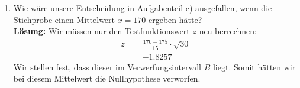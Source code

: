 \documentclass[11pt, a4paper]{article}
\begin{document}
\begin{enumerate}[label=\alph*)]
\begin{align*}
&= \frac{172 - 175}{15} \cdot \sqrt{30}\\
&\approx -1.0954
\intertext{Als nächstes ist der Verwerfungsbereich $B$ zu bestimmen mit $x_{1-\alpha} $ als $ (1-\alpha)$-Fraktil der $\mathcal N(0,1)$-Verteilung:}
B &\overset{\text{b)}}{=} (-\infty, -x_{1-\alpha})\\
&= (-\infty, -x_{1-0.04})\\
&= (-\infty, -x_{0.96})\\
&= (-\infty, -1.7507)
\end{align*}
Wir stellen fest, dass der Testfunktionswert $z \approx -1.0954$ nicht im Intervall B ist. Somit verwerfen wir unsere Nullhypothese nicht. Die Bahnen sind tatsächlich im Durchschnitt überfüllt.
\item Wie wäre unsere Entscheidung in Aufgabenteil c) ausgefallen, wenn die Stichprobe einen Mittelwert $\overline{x} = 170$ ergeben hätte?\\
\textbf{Lösung:} Wir müssen nur den Testfunktionswert $z$ neu berrechnen:
\begin{align*}
z &= \frac{170-175}{15} \cdot \sqrt{30}\\
&= -1.8257
\end{align*}
Wir stellen fest, dass dieser im Verwerfungsintervall $B$ liegt. Somit hätten wir bei diesem Mittelwert die Nullhypothese verworfen.\end{enumerate}


\end{document}
